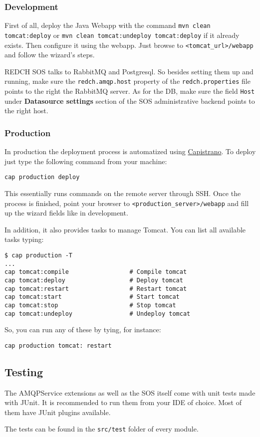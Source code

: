 \subsubsection*{Development}\label{development}

First of all, deploy the Java Webapp with the command
\texttt{mvn clean tomcat:deploy} or
\texttt{mvn clean tomcat:undeploy tomcat:deploy} if it already exists.
Then configure it using the webapp. Just browse to
\texttt{\textless{}tomcat\_url\textgreater{}/webapp} and follow the
wizard's steps.

REDCH SOS talks to RabbitMQ and Postgresql. So besides setting them up
and running, make sure the \texttt{redch.amqp.host} property of the
\texttt{redch.properties} file points to the right the RabbitMQ server.
As for the DB, make sure the field \texttt{Host} under
\textbf{Datasource settings} section of the SOS administrative backend
points to the right host.

\subsubsection*{Production}\label{production}

In production the deployment process is automatized using
\href{http://capistranorb.com/}{Capistrano}. To deploy just type the
following command from your machine:

\begin{verbatim}
cap production deploy
\end{verbatim}

This essentially runs commands on the remote server through SSH. Once
the process is finished, point your browser to
\texttt{\textless{}production\_server\textgreater{}/webapp} and fill up
the wizard fields like in development.

In addition, it also provides tasks to manage Tomcat. You can list all
available tasks typing:

\begin{verbatim}
$ cap production -T
...
cap tomcat:compile                 # Compile tomcat
cap tomcat:deploy                  # Deploy tomcat
cap tomcat:restart                 # Restart tomcat
cap tomcat:start                   # Start tomcat
cap tomcat:stop                    # Stop tomcat
cap tomcat:undeploy                # Undeploy tomcat
\end{verbatim}

So, you can run any of these by tying, for instance:

\begin{verbatim}
cap production tomcat: restart
\end{verbatim}

\subsection*{Testing}\label{testing}

The AMQPService extensions as well as the SOS itself come with unit
tests made with JUnit. It is recommended to run them from your IDE of
choice. Most of them have JUnit plugins available.

The tests can be found in the \texttt{src/test} folder of every module.

\clearpage
\newpage
